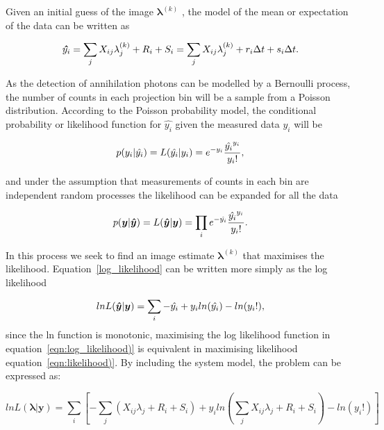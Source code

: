 Given an initial guess of the image $\bm\lambda^{(k)}$ , the model of the mean or expectation of the data can be written as

\begin{equation}
   \bm\hat{y_i} = \sum_j X_{ij} \lambda_j^{(k)} + R_i + S_i  = \sum_j X_{ij} \lambda_j^{(k)} + r_i\Delta t + s_i\Delta t  \\.
  \label{eqn:model_mean)}
\end{equation}

As the detection of annihilation photons can be modelled by a Bernoulli process, the number of counts in each projection bin will be a sample from a Poisson distribution. According to the Poisson probability model, the conditional probability or likelihood function for $\hat{y_i}$ given the measured data ${y_i}$ will be

\begin{equation}
p({y_i}|{\hat{y_i}}) = L({\hat{y_i}}|{y_i}) = e^{-{y_i}} \frac{\hat{y_i}^{y_i}}{{y_i}!}  \\ \\  , 
\label{eqn:bin_likelihood)}
\end{equation}

and under the assumption that measurements of counts in each bin are independent random processes the likelihood can be expanded for all the data

\begin{equation}
p(\bm{y}|\bm{\hat{y}}) = L(\bm{\hat{y}}|\bm{y}) = \prod_i e^{-\hat{y_i}} \frac{\hat{y_i}^{y_i}}{{y_i}!} \\ \\ .
\label{eqn:likelihood)}
\end{equation}

In this process we seek to find an image estimate  $\bm\lambda^{(k)}$ that maximises the likelihood. Equation~\ref{log_likelihood} can be written more simply as the log likelihood

\begin{equation}
    lnL(\bm{\hat{y}}|\bm{y})  = \sum_i  -\hat{y_i} + y_i ln(\hat{y_i}) - ln({y_i}!)  \\ ,
    \label{eqn:log_likelihood)}
\end{equation}since the ln function is monotonic, maximising the log likelihood function in equation~\ref{eqn:log_likelihood)} is equivalent in maximising likelihood equation~\ref{eqn:likelihood)}. By including the system model, the problem can be expressed as: 

\begin{equation}
    lnL(\bm{\lambda}|\bm{y})  = \sum_i\left[  -\sum_j (X_{ij} \lambda_j + R_i + S_i) + y_i ln(\sum_j X_{ij} \lambda_j + R_i + S_i) - ln({y_i}!) \right]
\end{equation}

